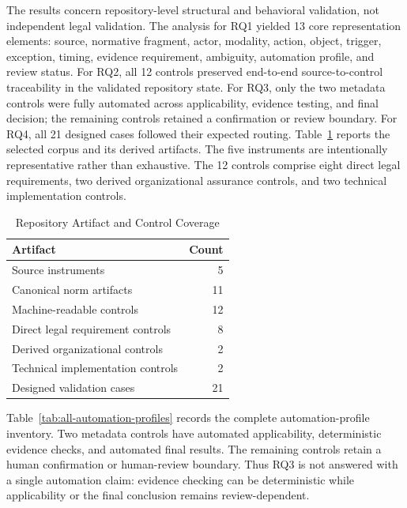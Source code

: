 \documentclass[10pt,journal]{IEEEtran}
\begin{document}
The results concern repository-level structural and behavioral validation, not independent legal validation. The analysis for RQ1 yielded 13 core representation elements: source, normative fragment, actor, modality, action, object, trigger, exception, timing, evidence requirement, ambiguity, automation profile, and review status. For RQ2, all 12 controls preserved end-to-end source-to-control traceability in the validated repository state. For RQ3, only the two metadata controls were fully automated across applicability, evidence testing, and final decision; the remaining controls retained a confirmation or review boundary. For RQ4, all 21 designed cases followed their expected routing. Table~\ref{tab:coverage} reports the selected corpus and its derived artifacts. The five instruments are intentionally representative rather than exhaustive. The 12 controls comprise eight direct legal requirements, two derived organizational assurance controls, and two technical implementation controls.

\begin{table}[!t]
\centering
\footnotesize
\caption{Repository Artifact and Control Coverage}
\label{tab:coverage}
\begin{tabular}{@{}lr@{}}
\toprule
\textbf{Artifact} & \textbf{Count} \\
\midrule
Source instruments & 5 \\
Canonical norm artifacts & 11 \\
Machine-readable controls & 12 \\
Direct legal requirement controls & 8 \\
Derived organizational controls & 2 \\
Technical implementation controls & 2 \\
Designed validation cases & 21 \\
\bottomrule
\end{tabular}
\end{table}

Table~\ref{tab:all-automation-profiles} records the complete automation-profile inventory. Two metadata controls have automated applicability, deterministic evidence checks, and automated final results. The remaining controls retain a human confirmation or human-review boundary. Thus RQ3 is not answered with a single automation claim: evidence checking can be deterministic while applicability or the final conclusion remains review-dependent.
\end{document}

